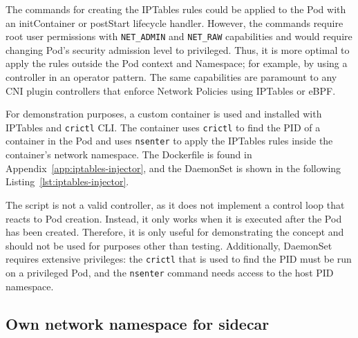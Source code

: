 \documentclass[english, 12pt, a4paper, sci, utf8, a-2b, online]{aaltothesis}
\begin{document}
The commands for creating the IPTables rules could be applied to the Pod with an initContainer or postStart lifecycle handler.
However, the commands require root user permissions with \lstinline{NET_ADMIN} and \lstinline{NET_RAW} capabilities and would require changing Pod's security admission level to privileged.
Thus, it is more optimal to apply the rules outside the Pod context and Namespace; for example, by using a controller in an operator pattern.
The same capabilities are paramount to any CNI plugin controllers that enforce Network Policies using IPTables or eBPF.

For demonstration purposes, a custom container is used and installed with IPTables and \lstinline{crictl} CLI.
The container uses \lstinline{crictl} to find the PID of a container in the Pod and uses \lstinline{nsenter} to apply the IPTables rules inside the container's network namespace.
The Dockerfile is found in Appendix~\ref{app:iptables-injector}, and the DaemonSet is shown in the following Listing~\ref{lst:iptables-injector}.



The script is not a valid controller, as it does not implement a control loop that reacts to Pod creation.
Instead, it only works when it is executed after the Pod has been created.
Therefore, it is only useful for demonstrating the concept and should not be used for purposes other than testing.
Additionally, DaemonSet requires extensive privileges: the \lstinline{crictl} that is used to find the PID must be run on a privileged Pod, and the \lstinline{nsenter} command needs access to the host PID namespace.

\subsection{Own network namespace for sidecar}



\end{document}
